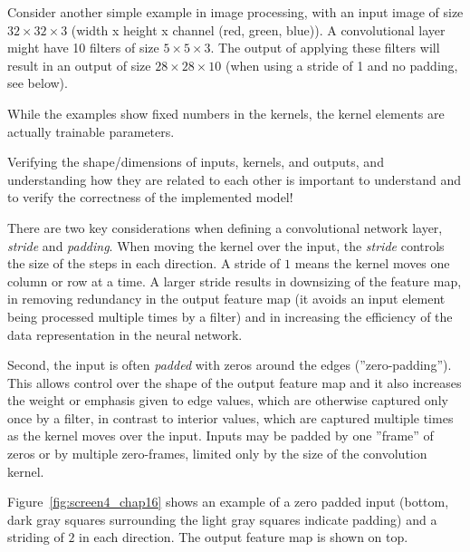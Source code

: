 Consider another simple example in image processing, with an input image of size $32 \times 32 \times 3$ (width x height x channel (red, green, blue)). A convolutional layer might have 10 filters of size $5 \times 5 \times 3$. The output of applying these filters will result in an output of size $28 \times 28 \times 10$ (when using a stride of 1 and no padding, see below).

\begin{tcolorbox}[colback=alert]
While the examples show fixed numbers in the kernels, the kernel elements are actually trainable parameters.
\end{tcolorbox}

\begin{tcolorbox}[colback=alert]
Verifying the shape/dimensions of inputs, kernels, and outputs, and understanding how they are related to each other is important to understand and to verify the correctness of the implemented model!
\end{tcolorbox}

There are two key considerations when defining a convolutional network layer, \emph{stride} and \emph{padding}. When moving the kernel over the input, the \emph{stride} controls the size of the steps in each direction. A stride of $1$ means the kernel moves one column or row at a time. A larger stride results in downsizing of the feature map, in removing redundancy in the output feature map (it avoids an input element being processed multiple times by a filter) and in increasing the efficiency of the data representation in the neural network.

Second, the input is often \emph{padded} with zeros around the edges (''zero-padding''). This allows control over the shape of the output feature map and it also increases the weight or emphasis given to edge values, which are otherwise captured only once by a filter, in contrast to interior values, which are captured multiple times as the kernel moves over the input. Inputs may be padded by one ''frame'' of zeros or by multiple zero-frames, limited only by the size of the convolution kernel.

Figure~\ref{fig:screen4_chap16} shows an example of a zero padded input (bottom, dark gray squares surrounding the light gray squares indicate padding) and a striding of $2$ in each direction. The output feature map is shown on top.  

